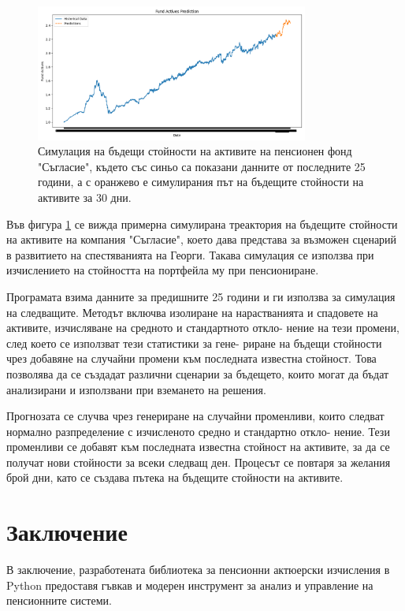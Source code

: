 \documentclass[a4paper,12pt]{article}
\begin{document}
\begin{figure}[ht]
        \centering
        \includegraphics[width=0.8\textwidth]{images/simulated_asset_values.png}
        \caption{Симулация на бъдещи стойности на активите на пенсионен фонд "Съгласие", където със синьо са показани данните от последните 25 години, а с оранжево е симулирания път на бъдещите стойности на активите за 30 дни.}
        \label{fig:simulated_asset_values}
\end{figure}
Във фигура \ref{fig:simulated_asset_values} се вижда примерна симулирана треактория на бъдещите стойности на активите на компания "Съгласие", което дава представа за възможен сценарий в развитието на спестяванията на Георги. Такава симулация се използва при изчислението на стойността на портфейла му при пенсиониране.

Програмата взима данните за предишните 25 години и ги използва за симулация на следващите. Методът включва изолиране на нарастванията и спадовете на активите, изчисляване на средното и стандартното откло- нение на тези промени, след което се използват тези статистики за гене- риране на бъдещи стойности чрез добавяне на случайни промени към последната известна стойност. Това позволява да се създадат различни сценарии за бъдещето, които могат да бъдат анализирани и използвани при вземането на решения.

Прогнозата се случва чрез генериране на случайни променливи, които следват нормално разпределение с изчисленото средно и стандартно откло- нение. Тези променливи се добавят към последната известна стойност на активите, за да се получат нови стойности за всеки следващ ден. Процесът се повтаря за желания брой дни, като се създава пътека на бъдещите стойности на активите.
\newpage
\section{Заключение}
В заключение, разработената библиотека за пенсионни актюерски изчисления в Python предоставя гъвкав и модерен инструмент за анализ и управление на пенсионните системи.
\end{document}
